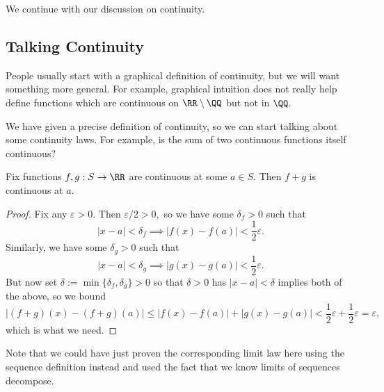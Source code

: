 
















We continue with our discussion on continuity.

\subsection{Talking Continuity}
People usually start with a graphical definition of continuity, but we will want something more general. For example, graphical intuition does not really help define functions which are continuous on $\RR\setminus\QQ$ but not in $\QQ.$

We have given a precise definition of continuity, so we can start talking about some continuity laws. For example, is the sum of two continuous functions itself continuous?
\begin{proposition}
	Fix functions $f,g:S\to\RR$ are continuous at some $a\in S.$ Then $f+g$ is continuous at $a.$
\end{proposition}
\begin{proof}
	Fix any $\varepsilon>0.$ Then $\varepsilon/2>0,$ so we have some $\delta_f>0$ such that
	\[|x-a|<\delta_f\implies|f(x)-f(a)|<\frac12\varepsilon.\]
	Similarly, we have some $\delta_g>0$ such that
	\[|x-a|<\delta_g\implies|g(x)-g(a)|<\frac12\varepsilon.\]
	But now set $\delta:=\min\{\delta_f,\delta_g\}>0$ so that $\delta>0$ has $|x-a|<\delta$ implies both of the above, so we bound
	\[|(f+g)(x)-(f+g)(a)|\le|f(x)-f(a)|+|g(x)-g(a)|<\frac12\varepsilon+\frac12\varepsilon=\varepsilon,\]
	which is what we need.
\end{proof}
Note that we could have just proven the corresponding limit law here using the sequence definition instead and used the fact that we know limits of sequences decompose.

